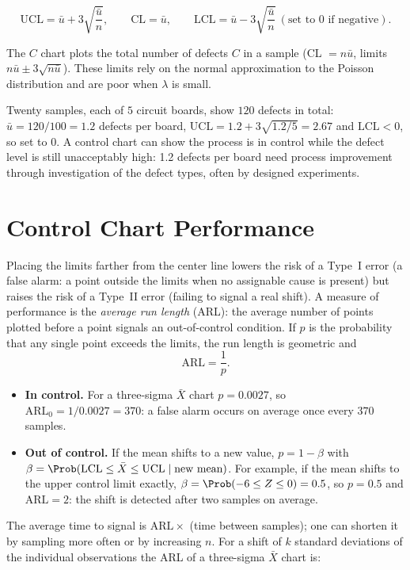 \begin{theorem}[$U$ chart]\label{thm:uchart}
\[ \mathrm{UCL}=\bar{u}+3\sqrt{\frac{\bar{u}}n},\qquad\mathrm{CL}=\bar{u},\qquad\mathrm{LCL}=\bar{u}-3\sqrt{\frac{\bar{u}}n}\ (\text{set to }0\text{ if negative}). \]
\end{theorem}

The $C$ chart plots the total number of defects $C$ in a sample (CL $=n\bar{u}$, limits $n\bar{u}\pm3\sqrt{n\bar{u}}$). These limits rely on the normal approximation to the Poisson distribution and are poor when $\lambda$ is small.

\begin{example}
Twenty samples, each of $5$ circuit boards, show $120$ defects in total: $\bar{u}=120/100=1.2$ defects per board, $\mathrm{UCL}=1.2+3\sqrt{1.2/5}=2.67$ and $\mathrm{LCL}<0$, so set to $0$. A control chart can show the process is in control while the defect level is still unacceptably high: 1.2 defects per board need process improvement through investigation of the defect types, often by designed experiments.
\end{example}

\section{Control Chart Performance}

Placing the limits farther from the center line lowers the risk of a Type~I error (a false alarm: a point outside the limits when no assignable cause is present) but raises the risk of a Type~II error (failing to signal a real shift). A measure of performance is the \emph{average run length} (ARL): the average number of points plotted before a point signals an out-of-control condition. If $p$ is the probability that any single point exceeds the limits, the run length is geometric and
\[ \mathrm{ARL}=\frac1p. \]

\begin{itemize}
  \item \textbf{In control.} For a three-sigma $\bar{X}$ chart $p=0.0027$, so $\mathrm{ARL}_0=1/0.0027=370$: a false alarm occurs on average once every $370$ samples.
  \item \textbf{Out of control.} If the mean shifts to a new value, $p=1-\beta$ with $\beta=\Prob(\mathrm{LCL}\le\bar{X}\le\mathrm{UCL}\mid\text{new mean})$. For example, if the mean shifts to the upper control limit exactly, $\beta=\Prob(-6\le Z\le0)=0.5$, so $p=0.5$ and $\mathrm{ARL}=2$: the shift is detected after two samples on average.
\end{itemize}
The average time to signal is $\mathrm{ARL}\times$ (time between samples); one can shorten it by sampling more often or by increasing $n$. For a shift of $k$ standard deviations of the individual observations the ARL of a three-sigma $\bar{X}$ chart is:

